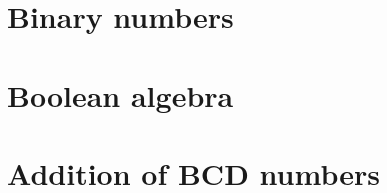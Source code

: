 \documentclass[11pt,a4paper]{article}
\author{Christian Rinderknecht}
\date{18 October 2006}
\begin{document}
\maketitle
\thispagestyle{empty}

\section{Binary numbers}



\section{Boolean algebra}




\section{Addition of BCD numbers}


\end{document}
